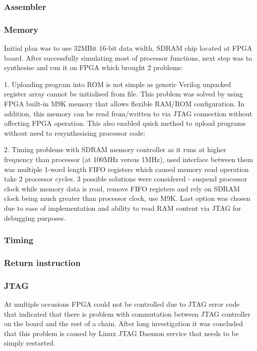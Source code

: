 \documentclass[a4paper,12pt]{article}
\begin{document}
\begin{multicols}{2}
\subsubsection{Assembler}
\subsubsection{Memory}
Initial plan was to use 32MBit 16-bit data width, SDRAM chip located at FPGA board. After successfully simulating most of processor functions, next step was to synthesise and run it on FPGA which brought 2 problems:

1. Uploading program into ROM is not simple as generic Verilog unpacked register array cannot be initialised from file. This problem was solved by using FPGA built-in M9K memory that allows flexible RAM/ROM configuration. In addition, this memory can be read from/written to via JTAG connection without affecting FPGA operation. This also enabled quick method to upload programs without need to resynthesising processor code;

2. Timing problems with SDRAM memory controller as it runs at higher frequency than processor (at 100MHz versus 1MHz), used interface between them was multiple 1-word length FIFO registers which caused memory read operation take 2 processor cycles. 3 possible solutions were considered - suspend processor clock while memory data is read, remove FIFO registers and rely on SDRAM clock being much greater than processor clock, use M9K. Last option was chosen due to ease of implementation and ability to read RAM content via JTAG for debugging purposes.
\subsubsection{Timing}

\subsubsection{Return instruction}

\subsubsection{JTAG}
At multiple occasions FPGA could not be controlled due to JTAG error code that indicated that there is problem with commutation between JTAG controller on the board and the rest of a chain. After long investigation it was concluded that this problem is caused by Linux JTAG Daemon service that needs to be simply restarted. 


\end{multicols}
\end{document}
